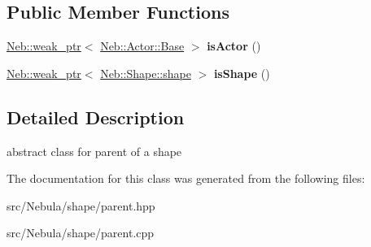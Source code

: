 \subsection*{\-Public \-Member \-Functions}
\begin{DoxyCompactItemize}
\item 
\hypertarget{classNeb_1_1Shape_1_1parent_ad8b140d7fd824fbc3248e711f9b748bc}{\hyperlink{classNeb_1_1weak__ptr}{\-Neb\-::weak\-\_\-ptr}$<$ \hyperlink{classNeb_1_1Actor_1_1Base}{\-Neb\-::\-Actor\-::\-Base} $>$ {\bfseries is\-Actor} ()}\label{classNeb_1_1Shape_1_1parent_ad8b140d7fd824fbc3248e711f9b748bc}

\item 
\hypertarget{classNeb_1_1Shape_1_1parent_ab41114661259f3f7dac9b251ea542e56}{\hyperlink{classNeb_1_1weak__ptr}{\-Neb\-::weak\-\_\-ptr}$<$ \hyperlink{classNeb_1_1Shape_1_1shape}{\-Neb\-::\-Shape\-::shape} $>$ {\bfseries is\-Shape} ()}\label{classNeb_1_1Shape_1_1parent_ab41114661259f3f7dac9b251ea542e56}

\end{DoxyCompactItemize}


\subsection{\-Detailed \-Description}
abstract class for parent of a shape 

\-The documentation for this class was generated from the following files\-:\begin{DoxyCompactItemize}
\item 
src/\-Nebula/shape/parent.\-hpp\item 
src/\-Nebula/shape/parent.\-cpp\end{DoxyCompactItemize}

